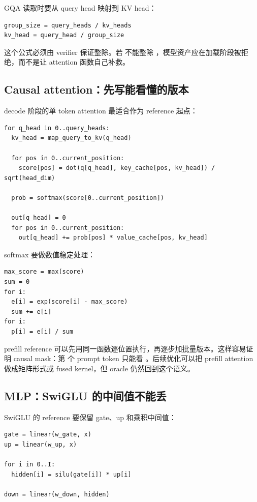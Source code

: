 GQA 读取时要从 query head 映射到 KV head：

\begin{lstlisting}[numbers=none,caption={GQA head 映射}]
group_size = query_heads / kv_heads
kv_head = query_head / group_size
\end{lstlisting}

这个公式必须由 verifier 保证整除。若  不能整除 ，模型资产应在加载阶段被拒绝，而不是让 attention 函数自己补救。

\subsection{Causal attention：先写能看懂的版本}

decode 阶段的单 token attention 最适合作为 reference 起点：

\begin{lstlisting}[numbers=none,caption={单 token decode attention reference}]
for q_head in 0..query_heads:
  kv_head = map_query_to_kv(q_head)

  for pos in 0..current_position:
    score[pos] = dot(q[q_head], key_cache[pos, kv_head]) / sqrt(head_dim)

  prob = softmax(score[0..current_position])

  out[q_head] = 0
  for pos in 0..current_position:
    out[q_head] += prob[pos] * value_cache[pos, kv_head]
\end{lstlisting}

softmax 要做数值稳定处理：

\begin{lstlisting}[numbers=none,caption={稳定 softmax}]
max_score = max(score)
sum = 0
for i:
  e[i] = exp(score[i] - max_score)
  sum += e[i]
for i:
  p[i] = e[i] / sum
\end{lstlisting}

prefill reference 可以先用同一函数逐位置执行，再逐步加批量版本。这样容易证明 causal mask：第  个 prompt token 只能看 。后续优化可以把 prefill attention 做成矩阵形式或 fused kernel，但 oracle 仍然回到这个语义。

\subsection{MLP：SwiGLU 的中间值不能丢}

SwiGLU 的 reference 要保留 gate、up 和乘积中间值：

\begin{lstlisting}[numbers=none,caption={SwiGLU MLP reference}]
gate = linear(w_gate, x)
up = linear(w_up, x)

for i in 0..I:
  hidden[i] = silu(gate[i]) * up[i]

down = linear(w_down, hidden)
\end{lstlisting}

